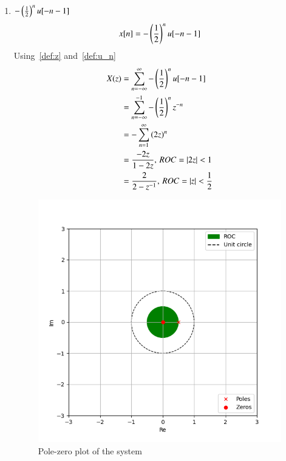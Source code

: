 \documentclass[journal,12pt,twocolumn]{IEEEtran}
\providecommand{\abs}[1]{\left\vert#1\right\vert}
\begin{document}
\begin{enumerate}[label= (\alph*)]
    \item $-\left(\frac{1}{2}\right)^n u[-n-1]$
    \begin{align}
        x[n]=-\left(\frac{1}{2}\right)^n u[-n-1]
    \end{align}
    Using~\eqref{def:z} and~\eqref{def:u_n}
    \begin{align}
        X(z)&=\sum_{n=-\infty}^{\infty} -\brak{\frac{1}{2}}^n u[-n-1]\\
        &=\sum_{n=-\infty}^{-1} -\brak{\frac{1}{2}}^n z^{-n}\\
        &=-\sum_{n=1}^{\infty} \brak{2z}^n\\
        &=\frac{-2z}{1-2z},\, ROC=\abs{2z} < 1\\
        &=\frac{2}{2-z^{-1}},\, ROC=\abs{z}<\frac{1}{2}
    \end{align}
    \begin{figure}[!ht]
        \centering
        \includegraphics[width=\columnwidth]{plot/b}
        \caption{Pole-zero plot of the system}
        \label{b}
    \end{figure}



\end{enumerate}
\end{document}
